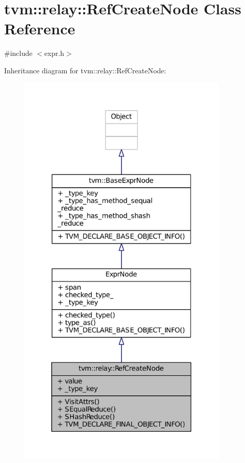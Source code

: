 \hypertarget{classtvm_1_1relay_1_1RefCreateNode}{}\section{tvm\+:\+:relay\+:\+:Ref\+Create\+Node Class Reference}
\label{classtvm_1_1relay_1_1RefCreateNode}


{\ttfamily \#include $<$expr.\+h$>$}



Inheritance diagram for tvm\+:\+:relay\+:\+:Ref\+Create\+Node\+:
\nopagebreak
\begin{figure}[H]
\begin{center}
\leavevmode
\includegraphics[height=550pt]{classtvm_1_1relay_1_1RefCreateNode__inherit__graph}
\end{center}
\end{figure}


